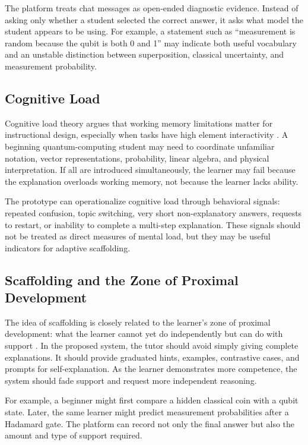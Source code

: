 \documentclass[11pt]{article}
\begin{document}
The platform treats chat messages as open-ended diagnostic evidence. Instead of asking only whether a student selected the correct answer, it asks what model the student appears to be using. For example, a statement such as ``measurement is random because the qubit is both 0 and 1'' may indicate both useful vocabulary and an unstable distinction between superposition, classical uncertainty, and measurement probability.

\subsection{Cognitive Load}

Cognitive load theory argues that working memory limitations matter for instructional design, especially when tasks have high element interactivity \cite{sweller1988load, sweller2010element}. A beginning quantum-computing student may need to coordinate unfamiliar notation, vector representations, probability, linear algebra, and physical interpretation. If all are introduced simultaneously, the learner may fail because the explanation overloads working memory, not because the learner lacks ability.

The prototype can operationalize cognitive load through behavioral signals: repeated confusion, topic switching, very short non-explanatory answers, requests to restart, or inability to complete a multi-step explanation. These signals should not be treated as direct measures of mental load, but they may be useful indicators for adaptive scaffolding.

\subsection{Scaffolding and the Zone of Proximal Development}

The idea of scaffolding is closely related to the learner's zone of proximal development: what the learner cannot yet do independently but can do with support \cite{vygotsky1978mind, wood1976tutoring}. In the proposed system, the tutor should avoid simply giving complete explanations. It should provide graduated hints, examples, contrastive cases, and prompts for self-explanation. As the learner demonstrates more competence, the system should fade support and request more independent reasoning.

For example, a beginner might first compare a hidden classical coin with a qubit state. Later, the same learner might predict measurement probabilities after a Hadamard gate. The platform can record not only the final answer but also the amount and type of support required.
\end{document}
